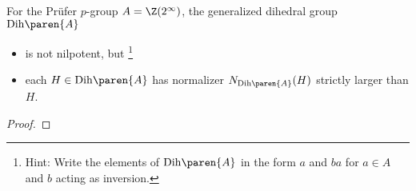 \documentclass[onesided]{ccg-pset}
\newcommand{\Dih}[1]{\mathrm{Dih}\paren{ #1 }}
\begin{document}
\begin{enumerate}
\begin{prop*}
    \label{prop:4}
    For the Prüfer $p$-group $A = \Z(2^\infty)$, the generalized dihedral group $\Dih A$ 
\begin{itemize}
\item is not nilpotent, but%
    \footnote{%
    Hint: Write the elements of $\Dih A$ in the form $a$ and $ba$ for $a \in A$ and $b$ acting as inversion.
    }

\item each $H \in \Dih A$ has normalizer $N_{\Dih A}(H)$ strictly larger than $H$.
\end{itemize}
\end{prop*}

\begin{proof}
    
\end{proof}
\end{enumerate}



\end{document}

